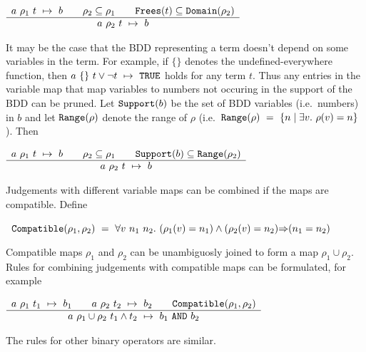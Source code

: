 \documentclass[12pt]{article}
\newcommand{\ml}[1]{{\tt #1}}
\newcommand{\termbdd}[4]{\mbox{$#1~#2~#3~\mapsto~#4$}}
\newcommand\imp{{\Rightarrow}}
\begin{document}
\smallskip


$\begin{array}{c}
\termbdd{a}{\rho_1}{t}{b} \qquad \rho_2\subseteq\rho_1 \qquad \ml{Frees}(t)\subseteq\ml{Domain}(\rho_2)
\\ \hline
\termbdd{a}{\rho_2}{t}{b}
\end{array}$

\smallskip

It may be the case that the BDD representing a term doesn't depend on
some variables in the term. For example, if $\{\}$ denotes the
undefined-everywhere function, then $\termbdd{a}{\{\}}{t\vee\neg
t}{\ml{TRUE}}$ holds for any term $t$. Thus any entries in the
variable map that map variables to numbers not occuring in the support
of the BDD can be pruned.  Let $\ml{Support}(b)$ be the set of BDD
variables (i.e.~numbers) in $b$ and let $\ml{Range}(\rho)$ denote the
range of $\rho$ (i.e.~$\ml{Range}(\rho)~=~\{n\mid \exists
v.~\rho(v)=n\}$). Then

\smallskip

$\begin{array}{c}
\termbdd{a}{\rho_1}{t}{b} \qquad \rho_2\subseteq\rho_1 \qquad \ml{Support}(b)\subseteq\ml{Range}(\rho_2)
\\ \hline
\termbdd{a}{\rho_2}{t}{b}
\end{array}$

\smallskip

Judgements with different variable maps can be combined if the maps are compatible.
Define 

\smallskip

~$\ml{Compatible}(\rho_1,\rho_2)~=~\forall v~n_1~n_2.~(\rho_1(v)=n_1)\wedge(\rho_2(v)=n_2)\imp(n_1=n_2)$

\smallskip

\noindent Compatible maps $\rho_1$ and $\rho_2$ can be unambiguosly
joined to form a map $\rho_1\cup \rho_2$. Rules for combining
judgements with compatible maps can be formulated, for example

\smallskip

$\begin{array}{c}
\termbdd{a}{\rho_1}{t_1}{b_1} \qquad \termbdd{a}{\rho_2}{t_2}{b_2} \qquad \ml{Compatible}(\rho_1,\rho_2)
\\ \hline
\termbdd{a}{\rho_1\cup\rho_2}{t_1\wedge t_2}{b_1~\ml{AND}~ b_2}
\end{array}$


\smallskip

\noindent The rules for other binary operators are similar.
\end{document}
